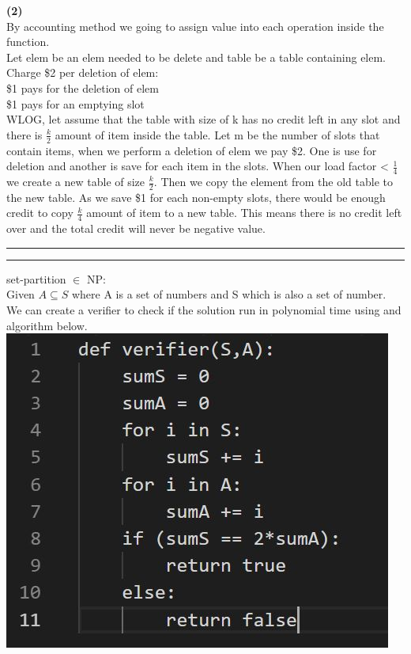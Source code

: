 \documentclass[a4paper, 11pt]{article}
\newcommand{\question}[2] {\vspace{.25in} \hrule\vspace{0.5em}
\noindent{\bf #1: #2} \vspace{0.5em}
\hrule \vspace{.10in}}
\renewcommand{\part}[1] {\vspace{.10in} {\bf (#1)}}
\begin{document}
\part{2}\\
By accounting method we going to assign value into each operation inside the function.\\
Let elem be an elem needed to be delete and table be a table containing elem.\\
Charge \$2 per deletion of elem:\\
\$1 pays for the deletion of elem\\
\$1 pays for an emptying slot\\
WLOG, let assume that the table with size of k has no credit left in any slot and there is $\frac{k}{2}$ amount of item inside the table. Let m be the number of slots that contain items, when we perform a deletion of elem we pay \$2. One is use for deletion and another is save for each item in the slots. When our load factor < $\frac{1}{4}$ we create a new table of size $\frac{k}{2}$. Then we copy the element from the old table to the new table. As we save \$1 for each non-empty slots, there would be enough credit to copy $\frac{k}{4}$ amount of item to a new table. This means there is no credit left over and the total credit will never be negative value.
\question{2}{Part2}
set-partition $\in$ NP:\\
Given $A \subseteq S$ where A is a set of numbers and S which is also a set of number.\\
We can create a verifier to check if the solution run in polynomial time using and algorithm below.\\
\includegraphics[width=\textwidth]{q2.jpg}\\
\end{document}
